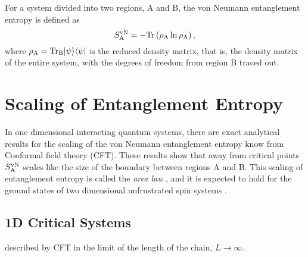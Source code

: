 For a system divided into two regions, A and B, the von Neumann entanglement entropy is defined as
\begin{equation}
	S^{\text{vN}}_\text{A} = -\rm{Tr}\left({\rho_A \ln \rho_A}\right),
\end{equation}
where $\rho_{\rm{A}}=\rm{Tr}_B\lvert {\psi} \rangle\langle {\psi} \rvert$ is the reduced density matrix, that is, the density matrix of the entire system, with the degrees of freedom from region B traced out.
\section{Scaling of Entanglement Entropy}
In one dimensional interacting quantum systems, there are exact analytical results for the scaling of the von Neumann entanglement entropy know from Conformal field theory (CFT).
These results show that away from critical points $S^{\text{vN}}_\text{A}$ scales like the size of the boundary between regions A and B.  This scaling of entanglement entropy is called the {\it area law} \cite{Shredder}, and it is expected to hold for the ground states of two dimensional unfrustrated spin systems \cite{DeBeaudrap2010} .




\subsection{1D Critical Systems}
\label{1dcft}

\cite{Cardy} \cite{Zhou2006}

described by CFT in the limit of the length of the chain, $L \rightarrow \infty$.

